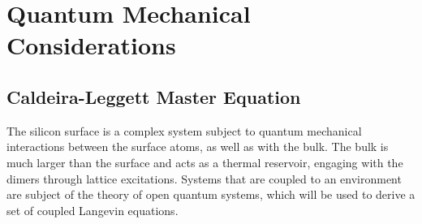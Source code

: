 	\section{Quantum Mechanical Considerations}
	\subsection{Caldeira-Leggett Master Equation}
	The silicon surface is a complex system subject to quantum mechanical interactions between the surface atoms, as well as with the bulk. The bulk is much larger than the surface and acts as a thermal reservoir, engaging with the dimers through lattice excitations. Systems that are coupled to an environment are subject of the theory of open quantum systems, which will be used to derive a set of coupled Langevin equations. \\
	
